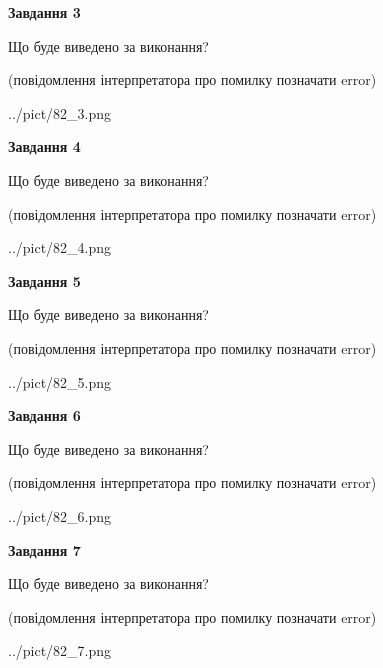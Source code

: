 \documentclass[12pt, ukrainian]{article}
\begin{document}
{\begin {large}
{\begin {center}\textbf{Завдання 3}\end {center}}\par
Що буде виведено за виконання?\par
 (повідомлення інтерпретатора про помилку позначати error)\par
\begin{center}
	{../pict/82_3.png}
\end{center}
\newpage

{\begin {center}\textbf{Завдання 4}\end {center}}\par
Що буде виведено за виконання?\par
 (повідомлення інтерпретатора про помилку позначати error)\par
\begin{center}
	{../pict/82_4.png}
\end{center}
\newpage

{\begin {center}\textbf{Завдання 5}\end {center}}\par
Що буде виведено за виконання?\par
 (повідомлення інтерпретатора про помилку позначати error)\par
\begin{center}
	{../pict/82_5.png}
\end{center}
\newpage

{\begin {center}\textbf{Завдання 6}\end {center}}\par
Що буде виведено за виконання?\par
 (повідомлення інтерпретатора про помилку позначати error)\par
\begin{center}
	{../pict/82_6.png}
\end{center}
\newpage

{\begin {center}\textbf{Завдання 7}\end {center}}\par
Що буде виведено за виконання?\par
 (повідомлення інтерпретатора про помилку позначати error)\par
\begin{center}
	{../pict/82_7.png}
\end{center}
\newpage


\end{large}}
\end{document}
